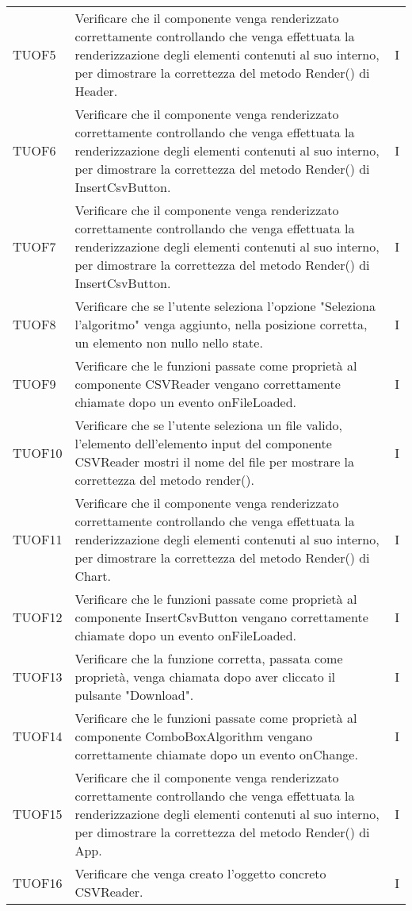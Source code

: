 \begin{longtable}{C{2cm} L{8cm} C{2cm}}
TUOF5 & Verificare che il componente venga renderizzato correttamente controllando che venga effettuata la renderizzazione degli elementi contenuti al suo interno, per dimostrare la correttezza del metodo Render() di Header. & I \\
TUOF6 & Verificare che il componente venga renderizzato correttamente controllando che venga effettuata la renderizzazione degli elementi contenuti al suo interno, per dimostrare la correttezza del metodo Render() di InsertCsvButton. & I \\
TUOF7 & Verificare che il componente venga renderizzato correttamente controllando che venga effettuata la renderizzazione degli elementi contenuti al suo interno, per dimostrare la correttezza del metodo Render() di InsertCsvButton. & I \\
TUOF8 & Verificare che se l’utente seleziona l’opzione "Seleziona l'algoritmo" venga aggiunto, nella posizione corretta, un elemento non nullo nello state. & I \\
TUOF9 & Verificare che le funzioni passate come proprietà al componente CSVReader vengano correttamente chiamate dopo un evento onFileLoaded. & I \\
TUOF10 & Verificare che se l’utente seleziona un file valido, l’elemento dell’elemento input del componente CSVReader mostri il nome del file per mostrare la correttezza del metodo render(). & I\\
TUOF11 & Verificare che il componente venga renderizzato correttamente controllando che venga effettuata la renderizzazione degli elementi contenuti al suo interno, per dimostrare la correttezza del metodo Render() di Chart. & I \\
TUOF12 & Verificare che le funzioni passate come proprietà al componente InsertCsvButton vengano correttamente chiamate dopo un evento onFileLoaded. & I \\
TUOF13 & Verificare che la funzione corretta, passata come proprietà, venga chiamata dopo aver cliccato il pulsante "Download". & I \\
TUOF14 & Verificare che le funzioni passate come proprietà al componente ComboBoxAlgorithm vengano correttamente chiamate dopo un evento onChange. & I \\
TUOF15 & Verificare che il componente venga renderizzato correttamente controllando che venga effettuata la renderizzazione degli elementi contenuti al suo interno, per dimostrare la correttezza del metodo Render() di App. & I \\
TUOF16 & Verificare che venga creato l’oggetto concreto CSVReader. & I \\

\end{longtable}
